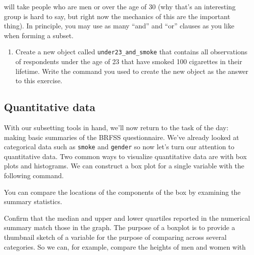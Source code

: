 \documentclass[]{article}
\newenvironment{Shaded}{\begin{snugshade}}{\end{snugshade}}
\newcommand{\KeywordTok}[1]{\textcolor[rgb]{0.13,0.29,0.53}{\textbf{{#1}}}}
\newcommand{\NormalTok}[1]{{#1}}
\begin{document}
will take people who are men or over the age of 30 (why that's an
interesting group is hard to say, but right now the mechanics of this
are the important thing). In principle, you may use as many ``and'' and
``or'' clauses as you like when forming a subset.

\begin{enumerate}
\def\labelenumi{\arabic{enumi}.}
\setcounter{enumi}{2}
\itemsep1pt\parskip0pt
\item
  Create a new object called \texttt{under23\_and\_smoke} that contains
  all observations of respondents under the age of 23 that have smoked
  100 cigarettes in their lifetime. Write the command you used to create
  the new object as the answer to this exercise.
\end{enumerate}

\subsection{Quantitative data}\label{quantitative-data}

With our subsetting tools in hand, we'll now return to the task of the
day: making basic summaries of the BRFSS questionnaire. We've already
looked at categorical data such as \texttt{smoke} and \texttt{gender} so
now let's turn our attention to quantitative data. Two common ways to
visualize quantitative data are with box plots and histograms. We can
construct a box plot for a single variable with the following command.

\begin{Shaded}
\end{Shaded}

You can compare the locations of the components of the box by examining
the summary statistics.

\begin{Shaded}
\end{Shaded}

Confirm that the median and upper and lower quartiles reported in the
numerical summary match those in the graph. The purpose of a boxplot is
to provide a thumbnail sketch of a variable for the purpose of comparing
across several categories. So we can, for example, compare the heights
of men and women with
\end{document}
